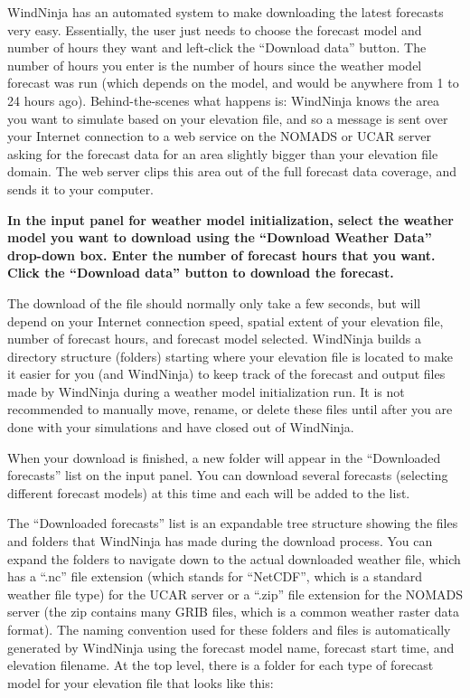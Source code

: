\documentclass[12pt]{article}
\begin{document}
WindNinja has an automated system to make downloading the latest forecasts very easy.  Essentially, the user just needs to choose the forecast model and number of hours they want and left-click the “Download data” button.  The number of hours you enter is the number of hours since the weather model forecast was run (which depends on the model, and would be anywhere from 1 to 24 hours ago).  Behind-the-scenes what happens is: WindNinja knows the area you want to simulate based on your elevation file, and so a message is sent over your Internet connection to a web service on the NOMADS or UCAR server asking for the forecast data for an area slightly bigger than your elevation file domain.  The web server clips this area out of the full forecast data coverage, and sends it to your computer.

\textbf{\color{red} In the input panel for weather model initialization, select the weather model you want to download using the “Download Weather Data” drop-down box.  Enter the number of forecast hours that you want.  Click the “Download data” button to download the forecast.}

The download of the file should normally only take a few seconds, but will depend on your Internet connection speed, spatial extent of your elevation file, number of forecast hours, and forecast model selected.  WindNinja builds a directory structure (folders) starting where your elevation file is located to make it easier for you (and WindNinja) to keep track of the forecast and output files made by WindNinja during a weather model initialization run.  It is not recommended to manually move, rename, or delete these files until after you are done with your simulations and have closed out of WindNinja.

When your download is finished, a new folder will appear in the “Downloaded forecasts” list on the input panel.  You can download several forecasts (selecting different forecast models) at this time and each will be added to the list.

The “Downloaded forecasts” list is an expandable tree structure showing the files and folders that WindNinja has made during the download process.  You can expand the folders to navigate down to the actual downloaded weather file, which has a “.nc” file extension (which stands for “NetCDF”, which is a standard weather file type) for the UCAR server or a “.zip” file extension for the NOMADS server (the zip contains many GRIB files, which is a common weather raster data format).  The naming convention used for these folders and files is automatically generated by WindNinja using the forecast model name, forecast start time, and elevation filename.  At the top level, there is a folder for each type of forecast model for your elevation file that looks like this:
\end{document}
